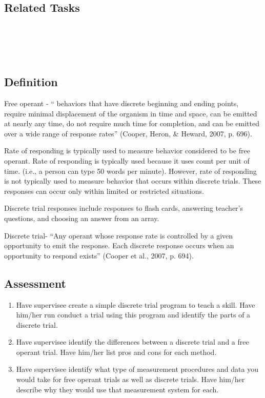 \subsection{Related Tasks}
\fourdThree{}\\
\fourdFive{}\\
\fourdSix{}\\
%
%
%
%
%
%
%
\section[\fourdEight{}]{\fourdEight{}%
              }
\subsection{Definition} 
Free operant - `` behaviors that have discrete beginning and ending points, require minimal displacement of the organism in time and space, can be emitted at nearly any time, do not require much time for completion, and can be emitted over a wide range of response rates'' (Cooper, Heron, \& Heward, 2007, p. 696).

Rate of responding is typically used to measure behavior considered to be free operant. Rate of responding is typically used because it uses count per unit of time. (i.e., a person can type 50 words per minute). However, rate of responding is not typically used to measure behavior that occurs within discrete trials. These responses can occur only within limited or restricted situations. 

Discrete trial responses include responses to flash cards, answering teacher's questions, and choosing an answer from an array. 

Discrete trial- ``Any operant whose response rate is controlled by a given opportunity to emit the response. Each discrete response occurs when an opportunity to respond exists'' (Cooper et al., 2007, p. 694).

\subsection{Assessment}
\begin{enumerate}
\item Have supervisee create a simple discrete trial program to teach a skill. Have him/her run conduct a trial using this program and identify the parts of a discrete trial.
\item Have supervisee identify the differences between a discrete trial and a free operant trial. Have him/her list pros and cons for each method.
\item Have supervisee identify what type of measurement procedures and data you would take for free operant trials as well as discrete trials. Have him/her describe why they would use that measurement system for each.
\end{enumerate}
%
